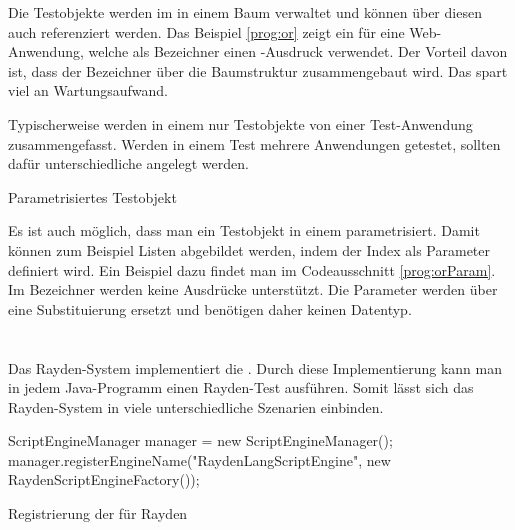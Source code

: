 \SuperPar
Die Testobjekte werden im  in einem Baum verwaltet und können über diesen auch referenziert werden. Das Beispiel \ref{prog:or} zeigt ein  für eine Web-Anwendung, welche als Bezeichner einen -Ausdruck verwendet.  Der Vorteil davon ist, dass der Bezeichner  über die Baumstruktur zusammengebaut wird. Das spart viel an Wartungsaufwand. 

\SuperPar
Typischerweise werden in einem  nur Testobjekte von einer Test-Anwendung zusammengefasst. Werden in einem Test mehrere Anwendungen getestet, sollten dafür unterschiedliche  angelegt werden.

\begin{program}
\caption{Parametrisiertes Testobjekt}
\label{prog:orParam}
\end{program}

\SuperPar
Es ist auch möglich, dass man ein Testobjekt in einem  parametrisiert. Damit können zum Beispiel Listen abgebildet werden, indem der Index als Parameter definiert wird. Ein Beispiel dazu findet man im Codeausschnitt \ref{prog:orParam}. Im Bezeichner  werden keine Ausdrücke unterstützt. Die Parameter werden über eine Substituierung ersetzt und benötigen daher keinen Datentyp.


\section{}

Das Rayden-System implementiert die . Durch diese Implementierung kann man in jedem Java-Programm einen Rayden-Test ausführen. Somit lässt sich das Rayden-System in viele unterschiedliche Szenarien einbinden. 

\begin{program}
\begin{JavaCode}
ScriptEngineManager manager = new ScriptEngineManager();
manager.registerEngineName("RaydenLangScriptEngine", 
    new RaydenScriptEngineFactory());
\end{JavaCode}
\caption{Registrierung der  für Rayden}
\label{prog:registerFactory}
\end{program}

